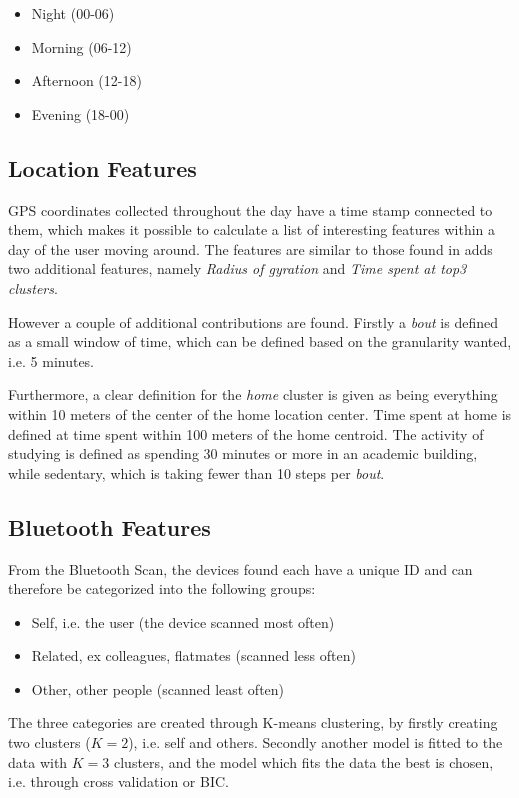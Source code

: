 \begin{itemize}
\item Night (00-06)
\item Morning (06-12)
\item Afternoon (12-18)
\item Evening (18-00)
\end{itemize}

\subsection{Location Features}
GPS coordinates collected throughout the day have a time stamp connected to them, which makes it possible to calculate a list of interesting features within a day of the user moving around. The features are similar to those found in \cite{Saeb2015} adds two additional features, namely \textit{Radius of gyration} and \textit{Time spent at top3 clusters}.

However a couple of additional contributions are found. Firstly a \textit{bout} is defined as a small window of time, which can be defined based on the granularity wanted, i.e. 5 minutes. 

Furthermore, a clear definition for the \textit{home} cluster is given as being everything within 10 meters of the center of the home location center. Time spent at home is defined at time spent within 100 meters of the home centroid. The activity of studying is defined as spending 30 minutes or more in an academic building, while sedentary, which is taking fewer than 10 steps per \textit{bout}.

\subsection{Bluetooth Features}
From the Bluetooth Scan, the devices found each have a unique ID and can therefore be categorized into the following groups:

\begin{itemize}
    \item Self, i.e. the user (the device scanned most often)
    \item Related, ex colleagues, flatmates (scanned less often)
    \item Other, other people (scanned least often)
\end{itemize}

The three categories are created through K-means clustering, by firstly creating two clusters ($K=2$), i.e. self and others. Secondly another model is fitted to the data with $K=3$ clusters, and the model which fits the data the best is chosen, i.e. through cross validation or BIC.


